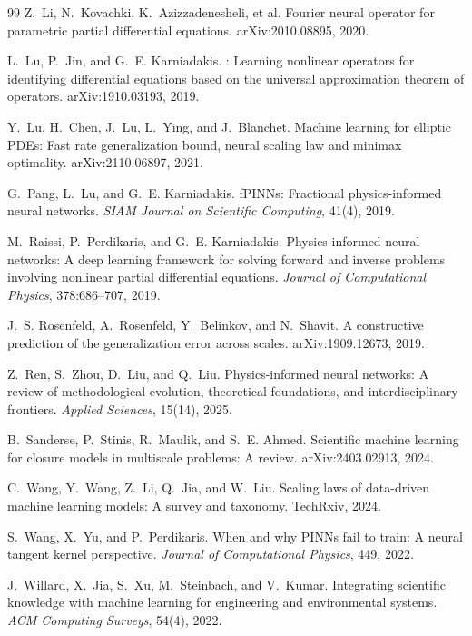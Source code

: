 \documentclass[11pt]{article}
\begin{document}
\begin{thebibliography}{99}
Z.~Li, N.~Kovachki, K.~Azizzadenesheli, et al.
\newblock Fourier neural operator for parametric partial differential equations.
\newblock arXiv:2010.08895, 2020.

L.~Lu, P.~Jin, and G.~E. Karniadakis.
: Learning nonlinear operators for identifying differential equations based on the universal approximation theorem of operators.
\newblock arXiv:1910.03193, 2019.

Y.~Lu, H.~Chen, J.~Lu, L.~Ying, and J.~Blanchet.
\newblock Machine learning for elliptic {PDE}s: Fast rate generalization bound, neural scaling law and minimax optimality.
\newblock arXiv:2110.06897, 2021.

G.~Pang, L.~Lu, and G.~E. Karniadakis.
\newblock f{PINNs}: Fractional physics-informed neural networks.
\newblock \emph{SIAM Journal on Scientific Computing}, 41(4), 2019.

M.~Raissi, P.~Perdikaris, and G.~E. Karniadakis.
\newblock Physics-informed neural networks: A deep learning framework for solving forward and inverse problems involving nonlinear partial differential equations.
\newblock \emph{Journal of Computational Physics}, 378:686--707, 2019.

J.~S. Rosenfeld, A.~Rosenfeld, Y.~Belinkov, and N.~Shavit.
\newblock A constructive prediction of the generalization error across scales.
\newblock arXiv:1909.12673, 2019.

Z.~Ren, S.~Zhou, D.~Liu, and Q.~Liu.
\newblock Physics-informed neural networks: A review of methodological evolution, theoretical foundations, and interdisciplinary frontiers.
\newblock \emph{Applied Sciences}, 15(14), 2025.

B.~Sanderse, P.~Stinis, R.~Maulik, and S.~E. Ahmed.
\newblock Scientific machine learning for closure models in multiscale problems: A review.
\newblock arXiv:2403.02913, 2024.

C.~Wang, Y.~Wang, Z.~Li, Q.~Jia, and W.~Liu.
\newblock Scaling laws of data-driven machine learning models: A survey and taxonomy.
\newblock TechRxiv, 2024.

S.~Wang, X.~Yu, and P.~Perdikaris.
\newblock When and why {PINNs} fail to train: A neural tangent kernel perspective.
\newblock \emph{Journal of Computational Physics}, 449, 2022.

J.~Willard, X.~Jia, S.~Xu, M.~Steinbach, and V.~Kumar.
\newblock Integrating scientific knowledge with machine learning for engineering and environmental systems.
\newblock \emph{ACM Computing Surveys}, 54(4), 2022.


\end{thebibliography}
\end{document}
